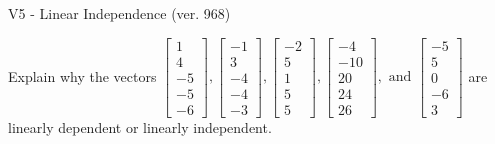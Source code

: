 \begin{exercise}
  \begin{exerciseTitle}V5 - Linear Independence (ver. 968)\end{exerciseTitle}
  \begin{exerciseStatement}
    Explain why the vectors \(\left[\begin{array}{r}
1 \\
4 \\
-5 \\
-5 \\
-6
\end{array}\right] , \left[\begin{array}{r}
-1 \\
3 \\
-4 \\
-4 \\
-3
\end{array}\right] , \left[\begin{array}{r}
-2 \\
5 \\
1 \\
5 \\
5
\end{array}\right] , \left[\begin{array}{r}
-4 \\
-10 \\
20 \\
24 \\
26
\end{array}\right] , \text{ and } \left[\begin{array}{r}
-5 \\
5 \\
0 \\
-6 \\
3
\end{array}\right]\) are linearly dependent or linearly independent.	



\end{exerciseStatement}
\end{exercise}
